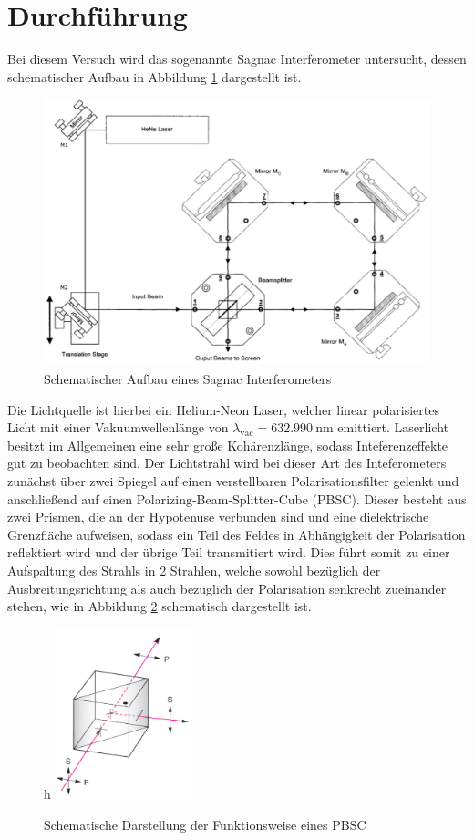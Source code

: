 \section{Durchführung}
\label{sec:Durchführung}

Bei diesem Versuch wird das sogenannte Sagnac Interferometer untersucht, dessen
schematischer Aufbau in Abbildung \ref{fig:aufbau} dargestellt ist.
\begin{figure}
  \centering
  \includegraphics[width=14cm]{Aufbau.png}
  \caption{Schematischer Aufbau eines Sagnac Interferometers \cite{skript}}
  \label{fig:aufbau}
\end{figure}
Die Lichtquelle ist hierbei ein Helium-Neon Laser, welcher linear polarisiertes Licht
mit einer Vakuumwellenlänge von
$\lambda_{\text{vac}}=\SI{632.990}{\nano\metre}$ emittiert.
Laserlicht besitzt im Allgemeinen eine sehr große Kohärenzlänge, sodass Inteferenzeffekte gut zu beobachten sind.
Der Lichtstrahl wird bei dieser Art des Inteferometers zunächst über zwei Spiegel auf einen
verstellbaren Polarisationsfilter gelenkt und anschließend auf einen Polarizing-Beam-Splitter-Cube (PBSC).
Dieser besteht aus zwei Prismen, die an der Hypotenuse verbunden sind und eine dielektrische Grenzfläche
aufweisen, sodass ein Teil des Feldes in Abhängigkeit der Polarisation reflektiert wird
und der übrige Teil transmitiert wird. Dies führt somit zu einer Aufspaltung des Strahls
in 2 Strahlen, welche sowohl bezüglich der Ausbreitungsrichtung als auch
bezüglich der Polarisation senkrecht zueinander stehen, wie in Abbildung \ref{fig:PBSC}
schematisch dargestellt ist.\\
\begin{figure}{h}
  \centering
  \includegraphics[width=4cm]{PBSC.png}
  \caption{Schematische Darstellung der Funktionsweise eines PBSC \cite{online1}}
  \label{fig:PBSC}
\end{figure}
